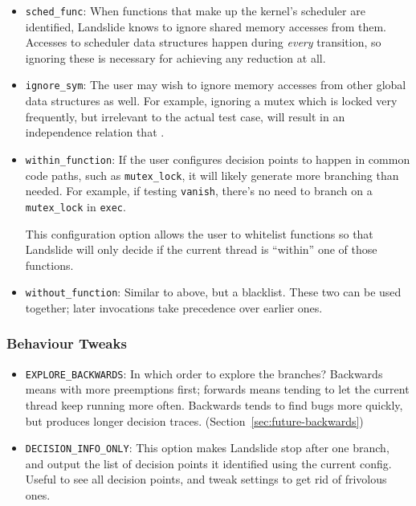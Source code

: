 \begin{itemize}
	\small
	\item \texttt{sched\_func}: When functions that make up the kernel's scheduler are identified, Landslide knows to ignore shared memory accesses from them. Accesses to scheduler data structures happen during {\em every} transition, so ignoring these is necessary for achieving any reduction at all.
	\item \texttt{ignore\_sym}: The user may wish to ignore memory accesses from other global data structures as well. For example, ignoring a mutex which is locked very frequently, but irrelevant to the actual test case, will result in an independence relation that .
	\item \texttt{within\_function}: If the user configures decision points to happen in common code paths, such as \texttt{mutex\_lock}, it will likely generate more branching than needed. For example, if testing \texttt{vanish}, there's no need to branch on a \texttt{mutex\_lock} in \texttt{exec}.

This configuration option allows the user to whitelist functions so that Landslide will only decide if the current thread is ``within'' one of those functions.
	\item \texttt{without\_function}: Similar to above, but a blacklist. These two can be used together; later invocations take precedence over earlier ones.
\end{itemize}

\subsubsection{Behaviour Tweaks}
\begin{itemize}
	\small
	\item \texttt{EXPLORE\_BACKWARDS}: In which order to explore the branches? Backwards means with more preemptions first; forwards means tending to let the current thread keep running more often. Backwards tends to find bugs more quickly, but produces longer decision traces. (Section~\ref{sec:future-backwards})
	\item \texttt{DECISION\_INFO\_ONLY}: This option makes Landslide stop after one branch, and output the list of decision points it identified using the current config. Useful to see all decision points, and tweak settings to get rid of frivolous ones.
\end{itemize}

